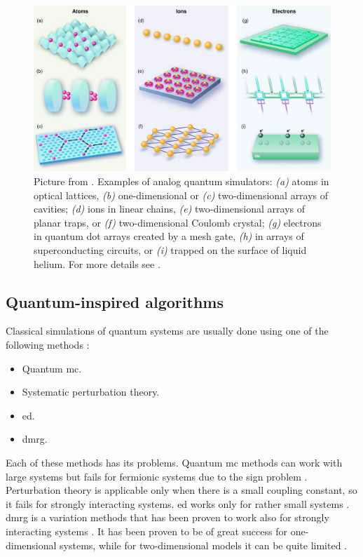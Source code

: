 \begin{figure}[t]
    \centering
    \includegraphics[width=\textwidth]{assets/figures/quantum_simulators.png}
    \caption[Examples of analog quantum simulators]{
        Picture from \cite{buluta2009simulators}.
        Examples of analog quantum simulators:
        \emph{(a)} atoms in optical lattices,
        \emph{(b)} one-dimensional or
        \emph{(c)} two-dimensional arrays of cavities;
        \emph{(d)} ions in linear chains,
        \emph{(e)} two-dimensional arrays of planar traps, or
        \emph{(f)} two-dimensional Coulomb crystal;
        \emph{(g)} electrons in quantum dot arrays created by a mesh gate,
        \emph{(h)} in arrays of superconducting circuits, or
        \emph{(i)} trapped on the surface of liquid helium.
        For more details see \cite{buluta2009simulators, georgescu2014simulation}.
    }
    \label{fig:analog_simulators}
\end{figure}


%
%
\subsection{Quantum-inspired algorithms}
\label{sub:quantum_inspired_algorithms}

Classical simulations of quantum systems are usually done using one of the following methods \cite{hauke2012simulators}:
\begin{itemize}[itemsep=0pt]
    \item Quantum \ac{mc}.
    \item Systematic perturbation theory.
    \item \Ac{ed}.
    \item \Ac{dmrg}.
\end{itemize}
Each of these methods has its problems.
Quantum \ac{mc} methods can work with large systems but fails for fermionic systems due to the sign problem \cite{sandvik2010computational, troyer2010computational}.
Perturbation theory is applicable only when there is a small coupling constant, so it fails for strongly interacting systems.
\Ac{ed} works only for rather small systems \cite{sandvik2010computational, troyer2010computational}.
\Ac{dmrg} is a variation methods that has been proven to work also for strongly interacting systems \cite{schollwock2011dmrg, mcculloch2007dmrg, dechiara2008dmrg}.
It has been proven to be of great success for one-dimensional systems, while for two-dimensional models it can be quite limited \cite{stoudenmire2012dmrg}.

